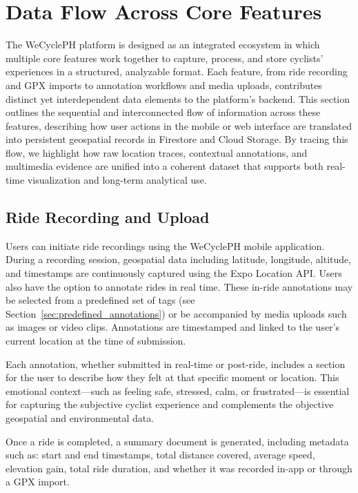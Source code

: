 \section{Data Flow Across Core Features}

The WeCyclePH platform is designed as an integrated ecosystem in which multiple core features work together to capture, process, and store cyclists' experiences in a structured, analyzable format. Each feature, from ride recording and GPX imports to annotation workflows and media uploads, contributes distinct yet interdependent data elements to the platform's backend. This section outlines the sequential and interconnected flow of information across these features, describing how user actions in the mobile or web interface are translated into persistent geospatial records in Firestore and Cloud Storage. By tracing this flow, we highlight how raw location traces, contextual annotations, and multimedia evidence are unified into a coherent dataset that supports both real-time visualization and long-term analytical use.

\subsection{Ride Recording and Upload}
Users can initiate ride recordings using the WeCyclePH mobile application. During a recording session, geospatial data including latitude, longitude, altitude, and timestamps are continuously captured using the Expo Location API. Users also have the option to annotate rides in real time. These in-ride annotations may be selected from a predefined set of tags (see Section~\ref{sec:predefined_annotations}) or be accompanied by media uploads such as images or video clips. Annotations are timestamped and linked to the user's current location at the time of submission.

Each annotation, whether submitted in real-time or post-ride, includes a section for the user to describe how they felt at that specific moment or location. This emotional context—such as feeling safe, stressed, calm, or frustrated—is essential for capturing the subjective cyclist experience and complements the objective geospatial and environmental data.

Once a ride is completed, a summary document is generated, including metadata such as: start and end timestamps, total distance covered, average speed, elevation gain, total ride duration, and whether it was recorded in-app or through a GPX import.

